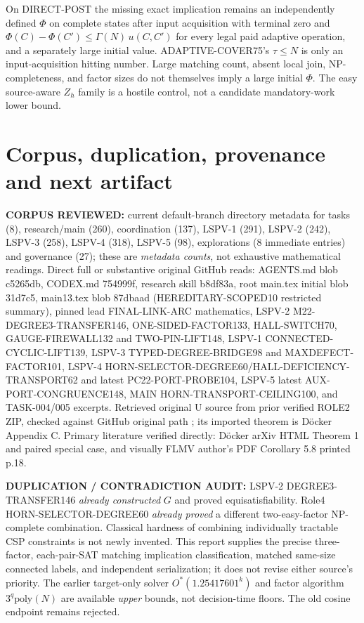 \documentclass[11pt]{article}
\begin{document}
On DIRECT-POST the missing exact implication remains an independently defined $\Phi$ on complete states after input acquisition with terminal zero and $\Phi(C)-\Phi(C')\le\Gamma(N)\,u(C,C')$ for every legal paid adaptive operation, and a separately large initial value. ADAPTIVE-COVER75's $\tau\le N$ is only an input-acquisition hitting number. Large matching count, absent local join, NP-completeness, and factor sizes do not themselves imply a large initial $\Phi$. The easy source-aware $Z_h$ family is a hostile control, not a candidate mandatory-work lower bound.

\section{Corpus, duplication, provenance and next artifact}
\noindent\textbf{CORPUS REVIEWED:} current default-branch directory metadata for tasks (8), research/main (260), coordination (137), LSPV-1 (291), LSPV-2 (242), LSPV-3 (258), LSPV-4 (318), LSPV-5 (98), explorations (8 immediate entries) and governance (27); these are \emph{metadata counts}, not exhaustive mathematical readings. Direct full or substantive original GitHub reads: AGENTS.md blob c5265db, CODEX.md 754999f, research skill b8df83a, root main.tex initial blob 31d7c5, main13.tex blob 87dbaad (HEREDITARY-SCOPED10 restricted summary), pinned lead FINAL-LINK-ARC mathematics, LSPV-2 M22-DEGREE3-TRANSFER146, ONE-SIDED-FACTOR133, HALL-SWITCH70, GAUGE-FIREWALL132 and TWO-PIN-LIFT148, LSPV-1 CONNECTED-CYCLIC-LIFT139, LSPV-3 TYPED-DEGREE-BRIDGE98 and MAXDEFECT-FACTOR101, LSPV-4 HORN-SELECTOR-DEGREE60/HALL-DEFICIENCY-TRANSPORT62 and latest PC22-PORT-PROBE104, LSPV-5 latest AUX-PORT-CONGRUENCE148, MAIN HORN-TRANSPORT-CEILING100, and TASK-004/005 excerpts. Retrieved original U source from prior verified ROLE2 ZIP, checked against GitHub original path ; its imported theorem is D\"ocker Appendix C. Primary literature verified directly: D\"ocker arXiv HTML Theorem 1 and paired special case, and visually FLMV author's PDF Corollary 5.8 printed p.18.

\noindent\textbf{DUPLICATION / CONTRADICTION AUDIT:} LSPV-2 DEGREE3-TRANSFER146 \emph{already constructed} $G$ and proved equisatisfiability. Role4 HORN-SELECTOR-DEGREE60 \emph{already proved} a different two-easy-factor NP-complete combination. Classical hardness of combining individually tractable CSP constraints is not newly invented. This report supplies the precise three-factor, each-pair-SAT matching implication classification, matched same-size connected labels, and independent serialization; it does not revise either source's priority. The earlier target-only solver $O^*(1.25417601^k)$ and factor algorithm $3^q\mathrm{poly}(N)$ are available \emph{upper} bounds, not decision-time floors. The old cosine endpoint remains rejected.
\end{document}
